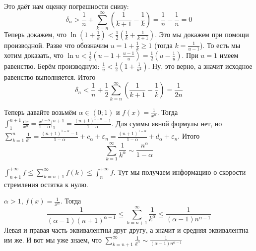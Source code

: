 \documentclass{article}
\begin{document}
\begin{itemize}
\begin{Example}
            Это даёт нам оценку погрешности снизу: $$\delta_n>\frac1n+\sum\limits_{k=n}^\infty\left(\frac1{k+1}-\frac1k\right)=\frac1n-\frac1n=0$$
            Теперь докажем, что $\ln\left(1+\frac1k\right)<\frac12\left(\frac1k+\frac1{k+1}\right)$. Это мы докажем при помощи производной. Разве что обозначим $u=1+\frac1k\geqslant1$ (тогда $k=\frac1{u-1}$). То есть мы хотим доказать, что $\ln u<\frac12\left(u-1+\frac{u-1}u\right)=\frac12\left(u-\frac1u\right)$. При $u=1$ имеем равенство. Берём производную: $\frac1u<\frac12\left(1+\frac1{u^2}\right)$. Ну, это верно, а значит исходное равенство выполняется. Итого
            $$\delta_n<\frac1n+\frac12\sum\limits_{k=n}^\infty\left(\frac1{k+1}-\frac1k\right)=\frac1{2n}$$
        \end{Example}
        \begin{Example}
            Теперь давайте возьмём $\alpha\in(0;1)$ и $f(x)=\frac1{x^\alpha}$. Тогда $\int_1^{n+1}\frac{\mathrm dx}{x^\alpha}=\frac{x^{1-\alpha}}{1-\alpha}\Big|_1^{n+1}=\frac{(n+1)^{1-\alpha}-1}{1-\alpha}$. Для суммы явной формулы нет, но $\sum\limits_{k=1}^n\frac1{k^\alpha}=\frac{(n+1)^{1-\alpha}-1}{1-\alpha}+c_\alpha+\varepsilon_n=\frac{(n+1)^{1-\alpha}}{1-\alpha}+d_\alpha+\varepsilon_n$. Итого
            $$
            \sum\limits_{k=1}^\infty\frac1{k^\alpha}\sim\frac{n^\alpha}{1-\alpha}
            $$
        \end{Example}
        \begin{Comment}
            $\int_{n+1}^{+\infty}f\leqslant\sum\limits_{k=n+1}^\infty f(k)\leqslant\int_n^{+\infty}f$. Тут мы получаем информацию о скорости стремления остатка к нулю.
        \end{Comment}
        \begin{Example}
            $\alpha>1$, $f(x)=\frac1{x^\alpha}$. Тогда
            $$
            \frac1{(\alpha-1)(n+1)^{\alpha-1}}\leqslant\sum\limits_{k=n+1}^\infty\frac1{k^\alpha}\leqslant\frac1{(\alpha-1)n^{\alpha-1}}
            $$
            Левая и правая часть эквивалентны друг другу, а значит и средняя эквивалентна им же. И вот мы уже знаем, что $\sum\limits_{k=n+1}^\infty\frac1{k^\alpha}\sim\frac1{(\alpha-1)n^{\alpha-1}}$
        \end{Example}
    \end{itemize}
\end{document}
